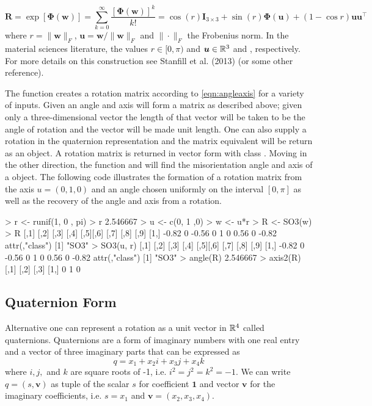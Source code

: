 \begin{equation}\label{eqn:angleaxis}
  \bm R=\exp[\bm{\Phi}(\bm{w})] = \sum\limits_{k=0}^\infty \frac{[\bm{\Phi}(\bm{w})]^k}{k!}=\cos(r)\bm{I}_{3\times3} + \sin(r) \bm{\Phi}(\bm{u}) + (1-\cos r) \bm{u} \bm{u}^\top
\end{equation}
where $r=\|\bm{w}\|_F$, $\bm{u} =\bm{w}/\|\bm{w}\|_F$ and $\|\cdot\|_F$ the Frobenius norm.  In the material sciences literature, the values $r\in[0,\pi)$ and  $\bm u\in\mathbb{R}^3$  and , respectively. For more details on this construction see Stanfill et al. (2013) (or some other reference). 

The function  creates a rotation matrix according to \eqref{eqn:angleaxis} for a variety of inputs.  Given an angle and axis  will form a matrix as described above; given only a three-dimensional vector the length of that vector will be taken to be the angle of rotation and the vector will be made unit length.  One can also supply a rotation in the quaternion representation and the matrix equivalent will be return as an  object.  A rotation matrix is returned in vector form with class . Moving in the other direction, the function  and  will find the misorientation angle and axis of a  object.  The following code illustrates the formation of a rotation matrix from the axis $u=(0, 1, 0)$ and an angle chosen uniformly on the interval $[0,\pi]$ as well as the recovery of the angle and axis from a rotation.

\begin{example}
> r <- runif(1, 0 , pi) 
> r
2.546667
> u <- c(0, 1 ,0)
> w <- u*r
> R <- SO3(w)
> R
      [,1] [,2]  [,3] [,4] [,5][,6]  [,7] [,8]  [,9]
[1,] -0.82    0 -0.56    0    1    0 0.56    0 -0.82
attr(,"class")
[1] "SO3"
> SO3(u, r)
      [,1] [,2]  [,3] [,4] [,5][,6]  [,7] [,8]  [,9]
[1,] -0.82    0 -0.56    0    1    0 0.56    0 -0.82
attr(,"class")
[1] "SO3"
> angle(R)
2.546667
> axis2(R)
     [,1] [,2] [,3]
[1,]    0    1    0
\end{example}

\subsection{Quaternion Form}

Alternative one can represent a rotation as a unit vector in $\mathbb{R}^4$ called quaternions.  Quaternions are a form of imaginary numbers with one real entry and a vector of three imaginary parts that can be expressed as
\[
q = x_1 + x_2 i + x_3 j + x_4 k
\]
where $i,j,$ and $k$ are square roots of -1, i.e. $i^2 = j^2= k^2 = -1$.  We can write $q=(s,\bm v)$ as tuple of the scalar $s$ for coefficient $\bm 1$ and vector $\bm v$ for the imaginary coefficients, i.e. $s=x_1$ and $\bm v= (x_2, x_3, x_4)$.

